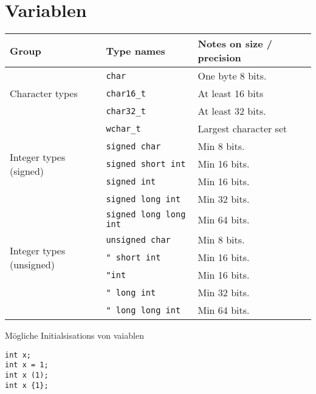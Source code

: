 \section{Variablen}

\begin{center}
	\begin{tabular}{ |l|l|l|l| } 
		\hline
		\textbf{Group} & \textbf{Type names} & \textbf{Notes on size / precision} \\
		\hline
		\multirow{3}{4em}{Character types} 
		& \texttt{char} & One byte  8 bits. \\ 
		& \texttt{char16\_t} & At least 16 bits \\ 
		& \texttt{char32\_t} & At least 32 bits. \\ 
		& \texttt{wchar\_t} & Largest character set \\ 
		\hline
		
		\multirow{3}{4em}{Integer types (signed)} 
		& \texttt{signed char} 			& Min 8 bits. \\ 
		& \texttt{signed short int} 	& Min 16 bits. \\ 
		& \texttt{signed int} 			& Min 16 bits. \\ 
		& \texttt{signed long int} 		& Min 32 bits. \\
		& \texttt{signed long long int} & Min 64 bits. \\
		\hline
		
 		\multirow{3}{4em}{Integer types (unsigned)} 
		& \texttt{unsigned char} 			& Min 8 bits. \\ 
		& \texttt{" short int} 		& Min 16 bits. \\ 
		& \texttt{"int} 			& Min 16 bits. \\ 
		& \texttt{" long int} 		& Min 32 bits. \\
		& \texttt{" long long int} 	& Min 64 bits. \\
		\hline
	\end{tabular}
\end{center}

Mögliche Initialsisations von vaiablen
\begin{lstlisting}	
int x;
int x = 1;
int x (1);
int x {1};
\end{lstlisting}